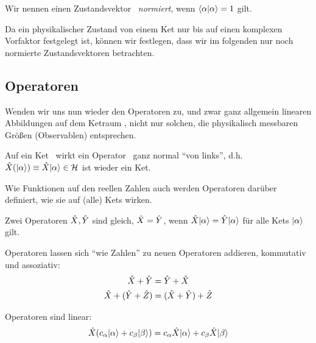 \begin{defn}
 Wir nennen einen Zustandsvektor \keta\ \emph{normiert}, wenn $\braket{\alpha | \alpha} = 1$ gilt.
\end{defn}
\begin{konv}
 Da ein physikalischer Zustand von einem Ket nur bis auf einen komplexen Vorfaktor festgelegt ist, k\"onnen wir festlegen, dass wir im folgenden nur noch normierte Zustandsvektoren betrachten.
\end{konv}

\subsection{Operatoren}
Wenden wir uns nun wieder den Operatoren zu, und zwar ganz allgemein linearen Abbildungen auf dem Ketraum \hs, nicht nur solchen, die physikalisch messbaren Gr\"o\ss{}en (Observablen) entsprechen.

\begin{eig}
Auf ein Ket \keta\ wirkt ein Operator \opx\ ganz normal \enquote{von links}, d.h. $\opx(\keta) \equiv \opx \keta \in \hs$ ist wieder ein Ket.
\end{eig}

\begin{eig}
 Wie Funktionen auf den reellen Zahlen auch werden Operatoren dar\"uber definiert, wie sie auf (alle) Kets wirken.
\end{eig}

\begin{bsp}
 Zwei Operatoren $\hat{X}, \hat{Y}$ sind gleich, $\hat{X}=\hat{Y}$, wenn $\opx \keta = \opy \keta$ f\"ur alle Kets $\keta$ gilt.
\end{bsp}

\begin{eig}
Operatoren lassen sich \enquote{wie Zahlen} zu neuen Operatoren addieren, kommutativ und assoziativ:
\begin{align}
\hat{X} + \hat{Y} &= \hat{Y} + \hat{X} \\
\hat{X} + (\hat{Y} + \hat{Z}) &= (\hat{X} + \hat{Y}) + \hat{Z}
\end{align}
\end{eig}

\begin{eig}
 Operatoren sind linear:
 \begin{equation}
  \opx(\ca \keta + \cb \ketb) = \ca \opx \keta + \cb \opx \ketb
 \end{equation}
\end{eig}

